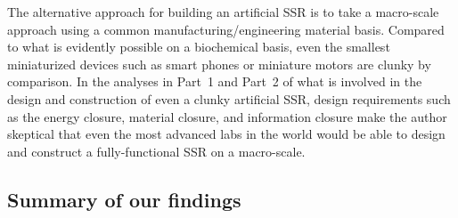 The alternative approach for building an artificial SSR is to take a
macro-scale approach using a
common manufacturing/engineering material basis.
Compared to what is evidently possible on a biochemical basis, even
the smallest miniaturized devices such as smart phones or miniature
motors are clunky by comparison.  In the analyses in Part~1 and
Part~2 of what is involved in the design and construction of even
a clunky artificial SSR, design requirements such as the energy
closure, material closure, and information closure make the author
skeptical that even the most advanced labs in the world would be
able to design and construct a fully-functional SSR on a macro-scale.

\subsection{Summary of our findings}

